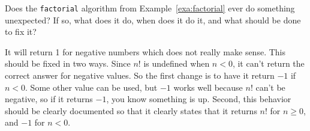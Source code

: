 \begin{ques}
Does the \verb+factorial+ algorithm from Example~\ref{exa:factorial} ever do something unexpected?
If so, what does it do, when does it do it, and what should be done to fix it?\\
\answerlinethree
\begin{answer}
It will return 1 for negative numbers which does not really make sense.
This should be fixed in two ways.  
Since $n!$ is undefined when $n<0$, it can't return the correct answer for negative values.
So the first change is to have it return $-1$ if $n<0$.  
Some other value can be used, but $-1$ works well because $n!$ can't be negative, so if it returns $-1$, you know something is up.  
Second, this behavior should be clearly documented so that it clearly states that it returns $n!$ for $n\geq 0$, and $-1$ for $n<0$.
\end{answer}
\end{ques}

